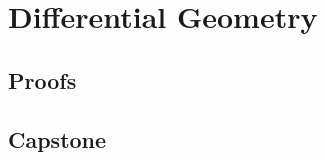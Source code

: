 \chapter{Differential Geometry}
\label{chap:differential-geometry}




\LRAExcludeFromPrintEditionBegin
\section*{Proofs}


\section*{Capstone}

\LRAExcludeFromPrintEditionEnd